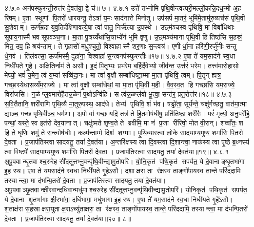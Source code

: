 ४.७.०
अन॑पस्फुरन्ती॒रुत्त॑र दे॒वत॑या॒ द्वे च॑॥ ७।
४.७.१
उत्ते॑ तभ्नोमि पृथि॒वीन्त्वत्परी॒मल्लों॒कन्नि॒दध॒न्मो अ॒ह रि॑षम्। ए॒ता स्थूणां पि॒तरो॑ धारयन्तु॒ तेऽत्रा॑ य॒मः साद॑नात्ते मिनोतु। उप॑सर्प मा॒तरं॒ भूमि॑मे॒तामु॑रु॒व्यच॑सं पृथि॒वी सु॒शेवाम्। ऊर्ण॑म्रदा युव॒तिर्दक्षि॑णावत्ये॒षा त्वा॑ पातु॒ निर्\mbox{}ऋ॑त्या उ॒पस्थे। उछ्म॑ञ्चस्व पृथिवि॒ मा विबा॑धिथाः सूपाय॒नास्मै॑ भव सूपवञ्च॒ना। मा॒ता पु॒त्रय्यँथा॑सि॒चाभ्ये॑नं भूमि वृणु। उ॒छ्मञ्च॑माना पृथि॒वी हि तिष्ठ॑सि स॒हस्रं॒ मित॒ उप॒ हि श्रय॑न्ताम्। ते गृ॒हासो॑ मधु॒श्चुतो॒ विश्वाहास्मै शर॒णाः स॒न्त्वत्र॑। एणीर्धा॒ना हरि॑णी॒रर्जु॑नीः सन्तु धे॒नव॑। तिल॑वत्सा॒ ऊर्ज॑मस्मै॒ दुहा॑ना॒ विश्वाहा॑ स॒न्त्वनप॑स्फुरन्तीः॥१७॥
४.७.२
ए॒षा ते॑ यम॒साद॑ने स्व॒धा निधी॑यते गृ॒हे। अक्षि॑ति॒र्नाम॑ ते असौ। इ॒दं पि॒तृभ्यः॒ प्रभ॑रेम ब॒र्\mbox{}हिर्दे॒वेभ्यो॒ जीव॑न्त॒ उत्त॑रं भरेम। तत्त्व॑मारो॒हासो॒ मेघ्यो॒ भवं॑ य॒मेन॒ त्वं य॒म्या॑ सव्विंदा॒नः। मा त्वा॑ वृ॒क्षौ सम्बा॑धिष्टा॒म्मा मा॒ता पृ॑थिवि॒ त्वम्। पि॒तॄन् ह्यत्र॒ गच्छा॒स्येधा॑सय्यँम॒राज्ये। मा त्वा॑ वृ॒क्षौ सम्बा॑धेथां॒ मा मा॒ता पृ॑थि॒वी म॒ही। वै॒व॒स्व॒त हि गच्छा॑सि यम॒राज्ये॒ विरा॑जसि। न॒ळं प्ल॒वमारो॑है॒तन्न॒ळेन॑ प॒थोऽन्वि॑हि। स त्व॑न्न॒ळप्ल॑वो भू॒त्वा॒ सन्त॑र॒ प्रत॒रोत्त॑र॥१८॥
४.७.३
स॒वि॒तैतानि॒ शरी॑राणि पृथि॒व्यै मा॒तुरु॒पस्थ॒ आद॑धे। तेभ्य॑ पृथिवि॒ शं भ॑व। षड्ढो॑ता॒ सूर्य॑न्ते॒ चक्षु॑र्गच्छतु॒ वात॑मा॒त्मा द्याञ्च॒ गच्छ॑ पृथि॒वीञ्च॒ धर्म॑णा। अ॒पो वा॑ गच्छ॒ यदि॒ तत्र॑ ते हि॒तमोष॑धीषु॒ प्रति॑तिष्ठा॒ शरी॑रैः। परं॑ मृत्यो॒ अनु॒परे॑हि॒ पन्थां॒ यस्ते॒ स्व इत॑रो देव॒यानात्। चक्षु॑ष्मते शृण्व॒ते ते ब्रवीमि॒ मा न॑ प्र॒जा री॑रिषो॒ मोत वी॒रान्। शव्वाँतः॒ श हि ते॒ घृणिः॒ शमु॑ ते स॒न्त्वोष॑धीः। कल्प॑न्ताम्मे॒ दिश॑ श॒ग्माः। पृ॒थि॒व्यास्त्वा॑ लो॒के सा॑दयाम्य॒मुष्य॒ शर्मा॑सि पि॒तरो॑ दे॒वता। प्र॒जाप॑तिस्त्वा सादयतु॒ तया॑ दे॒वत॑या। अ॒न्तरि॑क्षस्य त्वा दि॒वस्त्वा॑ दि॒शान्त्वा॒ नाक॑स्य त्वा पृ॒ष्ठे ब्र॒ध्नस्य॑ त्वा वि॒ष्टपे॑ सादयाम्य॒मुष्य॒ शर्मा॑सि पि॒तरो॑ दे॒वता। प्र॒जाप॑तिस्त्वा सादयतु॒ तया॑ दे॒वत॑या॥१९॥
४.८.१
अ॒पू॒पवान्घृ॒तवाश्च॒रुरेह सी॑दतूत्तभ्नु॒वन्पृ॑थि॒वीन्द्यामु॒तोपरि॑। यो॒नि॒कृत॑ पथि॒कृत॑ सपर्यत॒ ये दे॒वानाङ्घृ॒तभा॑गा इ॒ह स्थ। ए॒षा ते यम॒साद॑ने स्व॒धा निधी॑यते गृ॒हे॑ऽसौ। दशाक्षरा॒ ता र॑क्षस्व॒ ताङ्गो॑पायस्व॒ तान्ते॒ परि॑ददामि॒ तस्यान्त्वा॒ मा द॑भन्पि॒तरो॑ दे॒वता। प्र॒जाप॑तिस्त्वा सादयतु॒ तया॑ दे॒वत॑या। अ॒पू॒पवाञ्छृ॒तवान्क्षी॒रवा॒न्दधि॑वा॒न्मधु॑माश्च॒रुरेह सी॑दतूत्तभ्नु॒वन्पृ॑थि॒वीन्द्यामु॒तोपरि॑। यो॒नि॒कृत॑ पथि॒कृत॑ सपर्यत॒ ये दे॒वाना शृ॒तभा॑गाः क्षी॒रभा॑गा॒ दधि॑भागा॒ मधु॑भागा इ॒ह स्थ। ए॒षा ते॑ यम॒साद॑ने स्व॒धा निधी॑यते गृ॒हे॑ऽसौ। श॒ताक्ष॑रा स॒हस्राक्षरा॒युताक्ष॒राऽच्यु॑ताक्षरा॒ ता र॑क्षस्व॒ ताङ्गो॑पायस्व॒ तान्ते॒ परि॑ददामि॒ तस्यान्त्वा॒ मा द॑भन्पि॒तरो॑ दे॒वता। प्र॒जाप॑तिस्त्वा सादयतु॒ तया॑ दे॒वत॑या॥२०॥ ८॥
\anuvakamend

